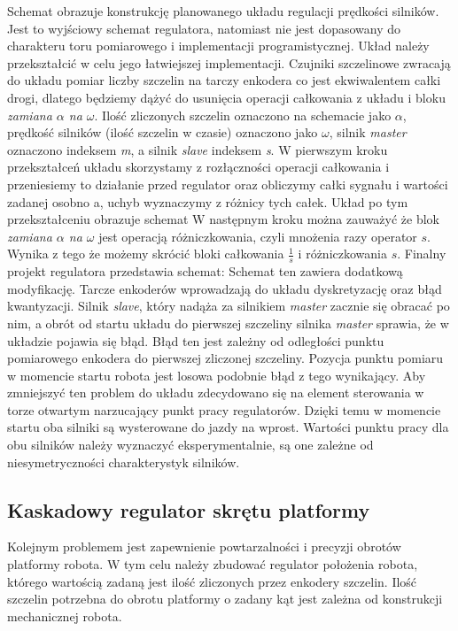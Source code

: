 \documentclass[11pt]{article}
\begin{document}
Schemat %
obrazuje konstrukcję planowanego układu regulacji prędkości silników.
Jest to wyjściowy schemat regulatora, natomiast nie jest dopasowany do charakteru toru pomiarowego i implementacji programistycznej.
Układ należy przekształcić w celu jego łatwiejszej implementacji.
Czujniki szczelinowe zwracają do układu pomiar liczby szczelin na tarczy enkodera co jest ekwiwalentem całki drogi, dlatego będziemy dążyć do usunięcia operacji całkowania z układu i bloku \textit{zamiana $ \alpha $ na $ \omega  $}.
Ilość zliczonych szczelin oznaczono na schemacie jako $ \alpha $, prędkość silników (ilość szczelin w czasie) oznaczono jako $ \omega $, silnik \textit{master} oznaczono indeksem \textit{m}, a silnik \textit{slave} indeksem \textit{s}.
W pierwszym kroku przekształceń układu skorzystamy z rozłączności operacji całkowania i przeniesiemy to działanie przed regulator oraz obliczymy całki sygnału i wartości zadanej osobno a, uchyb wyznaczymy z różnicy tych całek.
Układ po tym przekształceniu obrazuje schemat %
W następnym kroku można zauważyć że blok \textit{zamiana $ \alpha $ na $ \omega  $} jest operacją różniczkowania, czyli mnożenia razy operator $ s $. Wynika z tego że możemy skrócić bloki całkowania $ \frac{1}{s} $ i różniczkowania $ s $.
Finalny projekt regulatora przedstawia schemat: %
Schemat ten zawiera dodatkową modyfikację. Tarcze enkoderów wprowadzają do układu dyskretyzację oraz błąd kwantyzacji.
Silnik \textit{slave}, który nadąża za silnikiem \textit{master} zacznie się obracać po nim, a obrót od startu układu do pierwszej szczeliny silnika \textit{master} sprawia, że w układzie pojawia się błąd.
Błąd ten jest zależny od odległości punktu pomiarowego enkodera do pierwszej zliczonej szczeliny.
Pozycja punktu pomiaru w momencie startu robota jest losowa podobnie błąd z tego wynikający.
Aby zmniejszyć ten problem do układu zdecydowano się na element sterowania w torze otwartym narzucający punkt pracy regulatorów.
Dzięki temu w momencie startu oba silniki są wysterowane do jazdy na wprost.
Wartości punktu pracy dla obu silników należy wyznaczyć eksperymentalnie, są one zależne od niesymetryczności charakterystyk silników.


\subsection{Kaskadowy regulator skrętu platformy}
Kolejnym problemem jest zapewnienie powtarzalności i precyzji obrotów platformy robota.
W tym celu należy zbudować regulator położenia robota, którego wartością zadaną jest ilość zliczonych przez enkodery szczelin.
Ilość szczelin potrzebna do obrotu platformy o zadany kąt jest zależna od konstrukcji mechanicznej robota.
\end{document}
